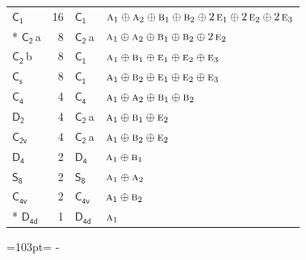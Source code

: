 \documentclass[10pt,a4paper]{article}
\newcommand{\needspace}[1]{\par\penalty-100\begingroup\dimen0=#1\relax\dimen2=\pagegoal
  \advance\dimen2-\pagetotal\ifdim\dimen0>\dimen2\relax\ifdim\dimen2>0pt\vfil\break\fi\fi
  \endgroup}
\numberwithin{equation}{section}
\newcommand{\grp}[1]{\mathsf{#1}}
\newcommand{\irr}[1]{\text{\normalfont\scshape #1}}
\newcommand{\clsletter}[1]{\,{\scriptsize\color{black!55}#1}}
\newlength{\fillwidth}\newlength{\cellwidth}\newlength{\colwidth}
\begin{document}
{\begin{longtable}{@{}lrl>{\RaggedRight\arraybackslash}p{\fillwidth}@{}}
\bottomrule\endfoot\endlastfoot
\href{C1.pdf}{$\grp{C_{1}}$} & 16 & \href{C1.pdf}{$\grp{C_{1}}$} & $\irr{a}_{1}\oplus \irr{a}_{2}\oplus \irr{b}_{1}\oplus \irr{b}_{2}\oplus 2\,\irr{e}_{1}\oplus 2\,\irr{e}_{2}\oplus 2\,\irr{e}_{3}$\\*
\href{C2.pdf}{$\grp{C_{2}}$}\clsletter{a} & 8 & \href{C2.pdf}{$\grp{C_{2}}$}\clsletter{a} & $\irr{a}_{1}\oplus \irr{a}_{2}\oplus \irr{b}_{1}\oplus \irr{b}_{2}\oplus 2\,\irr{e}_{2}$\\
\href{C2.pdf}{$\grp{C_{2}}$}\clsletter{b} & 8 & \href{C1.pdf}{$\grp{C_{1}}$} & $\irr{a}_{1}\oplus \irr{b}_{1}\oplus \irr{e}_{1}\oplus \irr{e}_{2}\oplus \irr{e}_{3}$\\
\href{C1v.pdf}{$\grp{C_{s}}$} & 8 & \href{C1.pdf}{$\grp{C_{1}}$} & $\irr{a}_{1}\oplus \irr{b}_{2}\oplus \irr{e}_{1}\oplus \irr{e}_{2}\oplus \irr{e}_{3}$\\
\href{C4.pdf}{$\grp{C_{4}}$} & 4 & \href{C4.pdf}{$\grp{C_{4}}$} & $\irr{a}_{1}\oplus \irr{a}_{2}\oplus \irr{b}_{1}\oplus \irr{b}_{2}$\\
\href{D2.pdf}{$\grp{D_{2}}$} & 4 & \href{C2.pdf}{$\grp{C_{2}}$}\clsletter{a} & $\irr{a}_{1}\oplus \irr{b}_{1}\oplus \irr{e}_{2}$\\
\href{C2v.pdf}{$\grp{C_{2v}}$} & 4 & \href{C2.pdf}{$\grp{C_{2}}$}\clsletter{a} & $\irr{a}_{1}\oplus \irr{b}_{2}\oplus \irr{e}_{2}$\\
\href{D4.pdf}{$\grp{D_{4}}$} & 2 & \href{D4.pdf}{$\grp{D_{4}}$} & $\irr{a}_{1}\oplus \irr{b}_{1}$\\
\href{S8.pdf}{$\grp{S_{8}}$} & 2 & \href{S8.pdf}{$\grp{S_{8}}$} & $\irr{a}_{1}\oplus \irr{a}_{2}$\\
\href{C4v.pdf}{$\grp{C_{4v}}$} & 2 & \href{C4v.pdf}{$\grp{C_{4v}}$} & $\irr{a}_{1}\oplus \irr{b}_{2}$\\*
\href{D4d.pdf}{$\grp{D_{4d}}$} & 1 & \href{D4d.pdf}{$\grp{D_{4d}}$} & $\irr{a}_{1}$\\
\bottomrule\end{longtable}}
\needspace{103pt}
\end{document}

